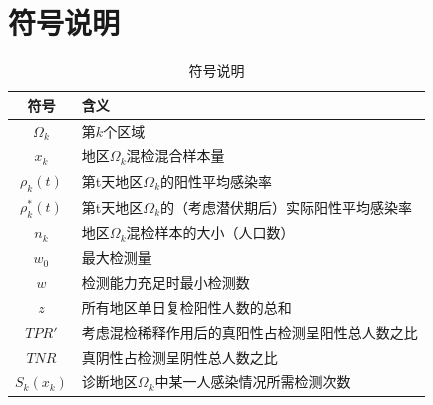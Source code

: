 \documentclass[withoutpreface,bwprint]{cumcmthesis} %
\begin{document}
\section{符号说明}
\begin{table}[H] %
    \begin{center} %
    \caption{符号说明} %
    \begin{tabular}{cl} %
        \toprule %
        \multicolumn{1}{m{3cm}}{\centering 符号} %
        & \multicolumn{1}{m{10cm}}{ 含义} %
        \\ %
        \midrule %
        $\Omega_k$	&第$k$个区域\\
        $x_k$  &地区$\Omega_k$混检混合样本量\\
        $\rho_k(t)$	&第t天地区$\Omega_k$的阳性平均感染率\\
        $\rho^*_k(t)$ &第t天地区$\Omega_k$的（考虑潜伏期后）实际阳性平均感染率 \\
        $n_k$       &地区$\Omega_k$混检样本的大小（人口数）\\
        $w_0$       &最大检测量\\
        $w$	        &检测能力充足时最小检测数\\
        $z$         &所有地区单日复检阳性人数的总和\\
        $TPR'$      &考虑混检稀释作用后的真阳性占检测呈阳性总人数之比 \\
        $TNR$       &真阴性占检测呈阴性总人数之比 \\
        $S_k(x_k)$    &诊断地区$\Omega_k$中某一人感染情况所需检测次数 \\
         \bottomrule
        \end{tabular} \label{tb:符号说明}%
    \end{center} %
\end{table} %
\end{document}
